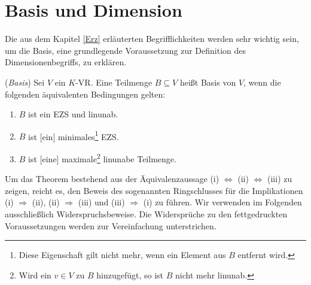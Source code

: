 \newpage
\section{Basis und Dimension}
\label{sec:Basis}
Die aus dem Kapitel \ref{Erz} erläuterten Begrifflichkeiten werden sehr wichtig sein, um die Basis, eine grundlegende Voraussetzung zur Definition des Dimensionenbegriffs, zu erklären.


\begin{theo}\cite[S. 41, 9.16]{Skript} \label{theo:Basis}(\emph{Basis}) \glqq Sei $V$ ein $K$-\acl{VR}. Eine Teilmenge $B \subseteq V$ heißt Basis von $V$, wenn die folgenden äquivalenten Bedingungen gelten:
		\begin{enumerate}
		\item \label{Basis1} $B$ ist ein \acl{EZS} und \acl{linunab}.
		\item \label{Basis2}$B$ ist [ein] minimales\footnote{Diese Eigenschaft gilt nicht mehr, wenn ein Element aus $B$ entfernt wird.} \acl{EZS}.
		\item \label{Basis3}$B$ ist [eine] maximale\footnote{Wird ein $v \in V$ zu $B$ hinzugefügt, so ist $B$ nicht mehr \acl{linunab}.} \acl{linunab}e Teilmenge.{\grqq}
		\end{enumerate}
\end{theo}

Um das Theorem bestehend aus der Äquivalenzaussage (i) $\Leftrightarrow$ (ii) $\Leftrightarrow$ (iii) zu zeigen, reicht es, den Beweis des sogenannten Ringschlusses für die Implikationen (i) $\Rightarrow$ (ii), (ii) $\Rightarrow$ (iii) und (iii) $\Rightarrow$ (i) zu führen. Wir verwenden im Folgenden ausschließlich Widerspruchsbeweise. Die Widersprüche zu den fettgedruckten Voraussetzungen werden zur Vereinfachung unterstrichen.

